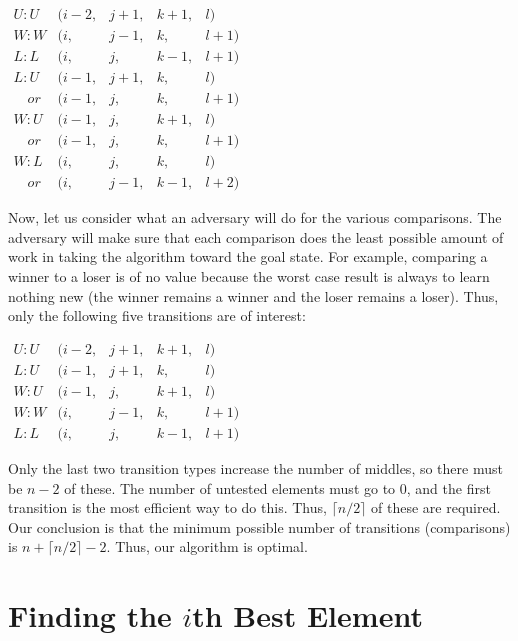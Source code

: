 \begin{center}
\(\begin{array}{lllll}
U:U&(i-2,&j+1,&k+1,&l)\\
W:W&(i,&j-1,&k,&l+1)\\
L:L&(i,&j,&k-1,&l+1)\\
L:U&(i-1,&j+1,&k,&l)\\
\quad or&(i-1,&j,&k,&l+1)\\
W:U&(i-1,&j,&k+1,&l)\\
\quad or&(i-1,&j,&k,&l+1)\\
W:L&(i,&j,&k,&l)\\
\quad or&(i,&j-1,&k-1,&l+2)
\end{array}\)
\end{center}

Now, let us consider what an adversary will do for the various
comparisons.
The adversary will make sure that each comparison does the least
possible amount of work in taking the algorithm toward the goal
state.
For example, comparing a winner to a loser is of no value because the
worst case result is always to learn nothing new (the winner remains a
winner and the loser remains a loser).
Thus, only the following five transitions are of interest:

\medskip
\begin{center}
\(\begin{array}{lllll}
U:U&(i-2,&j+1,&k+1,&l)\\
L:U&(i-1,&j+1,&k,&l)\\
W:U&(i-1,&j,&k+1,&l)\\
\hline
W:W&(i,&j-1,&k,&l+1)\\
L:L&(i,&j,&k-1,&l+1)
\end{array}\)
\end{center}

\medskip
Only the last two transition types increase the number of middles,
so there must be \(n-2\) of these.
The number of untested elements  must go to 0, and the first
transition is the most efficient way to do this.
Thus, \(\lceil n/2 \rceil\) of these are required.
Our conclusion is that the minimum possible number of transitions
(comparisons) is \(n + \lceil n/2 \rceil - 2\).
Thus, our algorithm is optimal.

\section{Finding the $i$th Best Element}
\label{ithElement}

